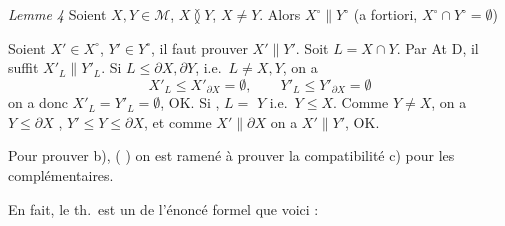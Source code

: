 \documentclass[11pt,a4paper]{article}
\begin{document}
\emph{Lemme 4} Soient $X, Y \in \mathcal{M}$, $X \between Y$, $X \neq Y$. Alors $X^{\circ} \parallel Y^{\circ}$ (a fortiori, $X^{\circ} \cap Y^{\circ} = \emptyset$)

Soient $X' \in X^{\circ}$, $Y' \in Y^{\circ}$, il faut prouver $X' \parallel Y'$. Soit $L = X \cap Y$. Par At D, il suffit  $X'_L \parallel Y'_L$. Si $L \leq \partial X, \partial Y$,  i.e.\ $L \neq X, Y$, on a
\[
  X'_L \leq X'_{\partial X} = \emptyset , \qquad Y'_L \leq Y'_{\partial X} = \emptyset
\]
 on a donc $X'_L = Y'_L = \emptyset$, OK. Si \struck{\ill{}} , $L =$  $Y$ i.e.\ $Y \leq X$. Comme $Y \neq X$, on a $Y \leq \partial X$ \ill{}, $Y' \leq Y \leq \partial X$, et comme $X' \parallel \partial X$ on a $X' \parallel Y'$, OK.

Pour prouver b), \struck{\ill{}} ( ) on est ramené à prouver la  compatibilité \ill{} c) pour les complémentaires. 

En fait, le th.\ est un   de l'énoncé formel que voici :
\end{document}
